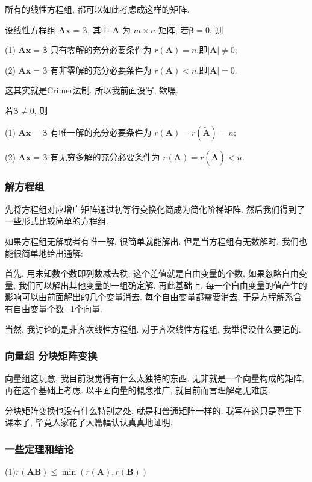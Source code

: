 \documentclass{article}
\begin{document}
所有的线性方程组, 都可以如此考虑成这样的矩阵.

设线性方程组 $\boldsymbol{A} \boldsymbol{x}=\boldsymbol{\beta}$, 其中 $\boldsymbol{A}$ 为 $m \times n$ 矩阵,
若$\boldsymbol{\beta} = 0$, 则

(1) $\boldsymbol{A} \boldsymbol{x}=\boldsymbol{\beta}$ 只有零解的充分必要条件为 $r(\boldsymbol{A})=n$,即$\left| \boldsymbol{A} \right| \neq 0$;

(2) $\boldsymbol{A} \boldsymbol{x}=\boldsymbol{\beta}$ 有非零解的充分必要条件为 $r(\boldsymbol{A})<n$,即$\left| \boldsymbol{A} \right| = 0$.

这其实就是Crimer法制. 所以我前面没写, 欸嘿.

若$\boldsymbol{\beta} \neq 0$, 则

(1) $\boldsymbol{A} \boldsymbol{x}=\boldsymbol{\beta}$ 有唯一解的充分必要条件为 $r(\boldsymbol{A})=r(\widetilde{\boldsymbol{A}})=n$;

(2) $\boldsymbol{A} \boldsymbol{x}=\boldsymbol{\beta}$ 有无穷多解的充分必要条件为 $r(\boldsymbol{A})=r(\widetilde{\boldsymbol{A}})<n$.
\subsubsection{解方程组}
先将方程组对应增广矩阵通过初等行变换化简成为简化阶梯矩阵. 然后我们得到了一些形式比较简单的方程组.

如果方程组无解或者有唯一解, 很简单就能解出. 但是当方程组有无数解时, 我们也能很简单地给出通解:

首先, 用未知数个数即列数减去秩, 这个差值就是自由变量的个数, 如果忽略自由变量, 我们可以解出其他变量的一组确定解. 再此基础上, 每一个自由变量的值产生的影响可以由前面解出的几个变量消去. 每个自由变量都需要消去, 于是方程解系含有自由变量个数+1个向量.

当然, 我讨论的是非齐次线性方程组. 对于齐次线性方程组, 我举得没什么要记的.

\subsubsection{向量组 分块矩阵变换}

向量组这玩意, 我目前没觉得有什么太独特的东西. 无非就是一个向量构成的矩阵, 再在这个基础上考虑. 以平面向量的概念推广, 就目前而言理解毫无难度.

分块矩阵变换也没有什么特别之处. 就是和普通矩阵一样的. 我写在这只是尊重下课本了, 毕竟人家花了大篇幅认认真真地证明.

\subsubsection{一些定理和结论}
(1)$r(\boldsymbol{A} \boldsymbol{B}) \leq \min (r(\boldsymbol{A}), r(\boldsymbol{B}))$
\end{document}
